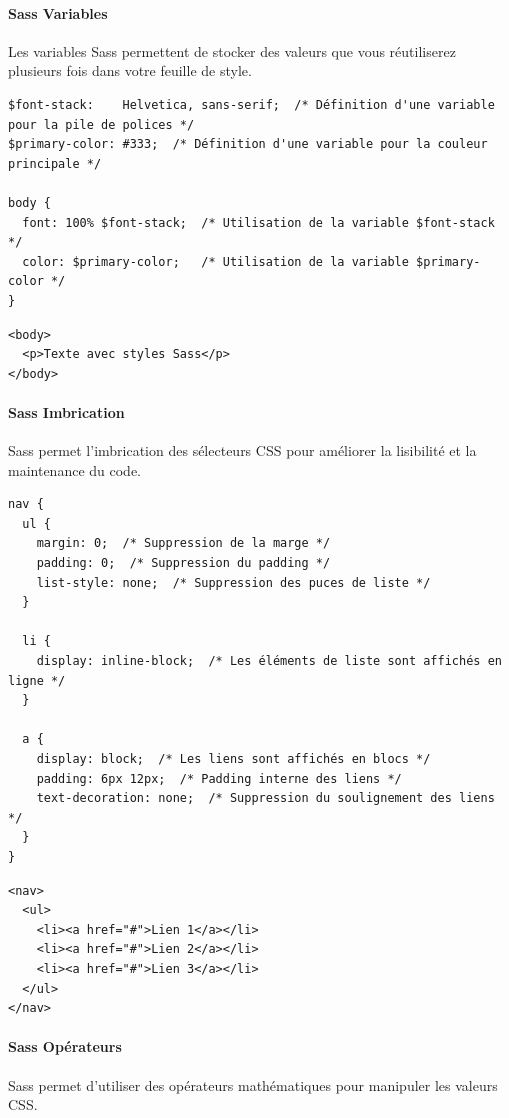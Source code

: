 \documentclass{report}
\begin{document}
\begin{multicols*}{2}
\paragraph{Sass Variables}
Les variables Sass permettent de stocker des valeurs que vous réutiliserez plusieurs fois dans votre feuille de style.

\begin{lstlisting}[style=CSSDraculaLight]
$font-stack:    Helvetica, sans-serif;  /* Définition d'une variable pour la pile de polices */
$primary-color: #333;  /* Définition d'une variable pour la couleur principale */

body {
  font: 100% $font-stack;  /* Utilisation de la variable $font-stack */
  color: $primary-color;   /* Utilisation de la variable $primary-color */
}
\end{lstlisting}

\begin{lstlisting}[style=HTMLDraculaDark]
<body>
  <p>Texte avec styles Sass</p>
</body>
\end{lstlisting}

\paragraph{Sass Imbrication}
Sass permet l'imbrication des sélecteurs CSS pour améliorer la lisibilité et la maintenance du code.

\begin{lstlisting}[style=CSSDraculaLight]
nav {
  ul {
    margin: 0;  /* Suppression de la marge */
    padding: 0;  /* Suppression du padding */
    list-style: none;  /* Suppression des puces de liste */
  }

  li { 
    display: inline-block;  /* Les éléments de liste sont affichés en ligne */
  }

  a {
    display: block;  /* Les liens sont affichés en blocs */
    padding: 6px 12px;  /* Padding interne des liens */
    text-decoration: none;  /* Suppression du soulignement des liens */
  }
}
\end{lstlisting}

\begin{lstlisting}[style=HTMLDraculaDark]
<nav>
  <ul>
    <li><a href="#">Lien 1</a></li>
    <li><a href="#">Lien 2</a></li>
    <li><a href="#">Lien 3</a></li>
  </ul>
</nav>
\end{lstlisting}

\paragraph{Sass Opérateurs}
Sass permet d'utiliser des opérateurs mathématiques pour manipuler les valeurs CSS.


\end{multicols*}
\end{document}
